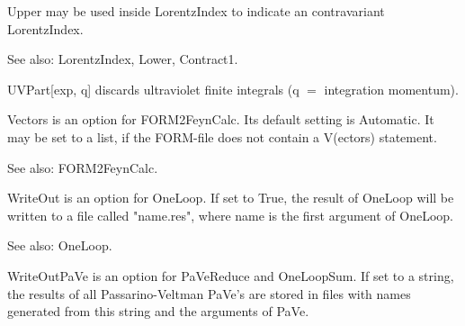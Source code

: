 \dispSFoutmath{
\{ \} 
}









Upper may be used inside LorentzIndex to indicate an contravariant LorentzIndex.

See also: { }LorentzIndex, Lower, Contract1.



UVPart[exp, q] discards ultraviolet finite integrals { }(q \(=\) integration momentum).





Vectors is an option for FORM2FeynCalc. Its default setting is Automatic. It may be set to a list, if the FORM-file does not contain a
  V(ectors) statement.

See also: { }FORM2FeynCalc.



WriteOut is an option for OneLoop. { }If set to True, the result of OneLoop will be written to a file called "name.res", where name is
  the first argument of OneLoop.

See also: { }OneLoop.



WriteOutPaVe is an option for PaVeReduce and OneLoopSum. If set to a string, the results of all Passarino-Veltman PaVe's are stored in
  files with names generated from this string and the arguments of PaVe.

